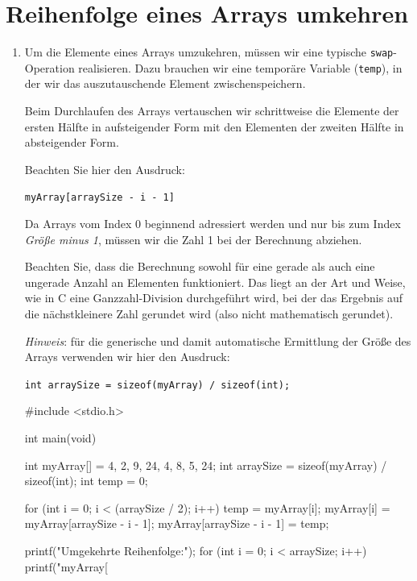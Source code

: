 \chapter{Reihenfolge eines Arrays umkehren}

\begin{enumerate}
    \item Um die Elemente eines Arrays umzukehren, müssen wir eine typische
    \texttt{swap}-Operation realisieren. Dazu brauchen wir eine
    temporäre Variable (\texttt{temp}), in der wir das auszutauschende
    Element zwischenspeichern.

    Beim Durchlaufen des Arrays vertauschen wir schrittweise die Elemente der
    ersten Hälfte in aufsteigender Form mit den Elementen der zweiten Hälfte in
    absteigender Form.

    Beachten Sie hier den Ausdruck:

    \noindent\texttt{myArray[arraySize - i - 1]}

    Da Arrays vom Index 0 beginnend adressiert werden und nur bis zum Index
    \textit{Größe minus 1}, müssen wir die Zahl 1 bei der Berechnung abziehen.

    Beachten Sie, dass die Berechnung sowohl für eine gerade als auch eine
    ungerade Anzahl an Elementen funktioniert. Das liegt an der Art und Weise,
    wie in C eine Ganzzahl-Division durchgeführt wird, bei der das Ergebnis auf
    die nächstkleinere Zahl gerundet wird (also nicht mathematisch gerundet).

    \textit{Hinweis}: für die generische und damit automatische Ermittlung der
    Größe des Arrays verwenden wir hier den Ausdruck:

    \noindent\texttt{int arraySize = sizeof(myArray) / sizeof(int);}

\begin{codebox}[lang=c, fontsize=\small]
#include <stdio.h>

int main(void) {
    int myArray[] = {4, 2, 9, 24, 4, 8, 5, 24};
    int arraySize = sizeof(myArray) / sizeof(int);
    int temp = 0;

    for (int i = 0; i < (arraySize / 2); i++) {
        temp = myArray[i];
        myArray[i] = myArray[arraySize - i - 1];
        myArray[arraySize - i - 1] = temp;
    }

    printf("Umgekehrte Reihenfolge:\n");
    for (int i = 0; i < arraySize; i++) {
        printf("myArray[%
    }
}
\end{codebox}


\end{enumerate}
